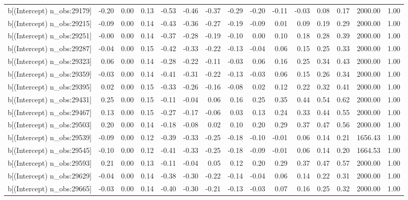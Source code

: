 \begin{table}[ht]
\begin{tabular}{rrrrrrrrrrrrrrr}
  b[(Intercept) n\_obs:29179] & -0.20 & 0.00 & 0.13 & -0.53 & -0.46 & -0.37 & -0.29 & -0.20 & -0.11 & -0.03 & 0.08 & 0.17 & 2000.00 & 1.00 \\ 
  b[(Intercept) n\_obs:29215] & -0.09 & 0.00 & 0.14 & -0.43 & -0.36 & -0.27 & -0.19 & -0.09 & 0.01 & 0.09 & 0.19 & 0.29 & 2000.00 & 1.00 \\ 
  b[(Intercept) n\_obs:29251] & -0.00 & 0.00 & 0.14 & -0.37 & -0.28 & -0.19 & -0.10 & 0.00 & 0.10 & 0.18 & 0.28 & 0.39 & 2000.00 & 1.00 \\ 
  b[(Intercept) n\_obs:29287] & -0.04 & 0.00 & 0.15 & -0.42 & -0.33 & -0.22 & -0.13 & -0.04 & 0.06 & 0.15 & 0.25 & 0.33 & 2000.00 & 1.00 \\ 
  b[(Intercept) n\_obs:29323] & 0.06 & 0.00 & 0.14 & -0.28 & -0.22 & -0.11 & -0.03 & 0.06 & 0.16 & 0.25 & 0.34 & 0.43 & 2000.00 & 1.00 \\ 
  b[(Intercept) n\_obs:29359] & -0.03 & 0.00 & 0.14 & -0.41 & -0.31 & -0.22 & -0.13 & -0.03 & 0.06 & 0.15 & 0.26 & 0.34 & 2000.00 & 1.00 \\ 
  b[(Intercept) n\_obs:29395] & 0.02 & 0.00 & 0.15 & -0.33 & -0.26 & -0.16 & -0.08 & 0.02 & 0.12 & 0.22 & 0.32 & 0.41 & 2000.00 & 1.00 \\ 
  b[(Intercept) n\_obs:29431] & 0.25 & 0.00 & 0.15 & -0.11 & -0.04 & 0.06 & 0.16 & 0.25 & 0.35 & 0.44 & 0.54 & 0.62 & 2000.00 & 1.00 \\ 
  b[(Intercept) n\_obs:29467] & 0.13 & 0.00 & 0.15 & -0.27 & -0.17 & -0.06 & 0.03 & 0.13 & 0.24 & 0.33 & 0.44 & 0.55 & 2000.00 & 1.00 \\ 
  b[(Intercept) n\_obs:29503] & 0.20 & 0.00 & 0.14 & -0.18 & -0.08 & 0.02 & 0.10 & 0.20 & 0.29 & 0.37 & 0.47 & 0.56 & 2000.00 & 1.00 \\ 
  b[(Intercept) n\_obs:29539] & -0.09 & 0.00 & 0.12 & -0.39 & -0.33 & -0.25 & -0.18 & -0.10 & -0.01 & 0.06 & 0.14 & 0.21 & 1656.43 & 1.00 \\ 
  b[(Intercept) n\_obs:29545] & -0.10 & 0.00 & 0.12 & -0.41 & -0.33 & -0.25 & -0.18 & -0.09 & -0.01 & 0.06 & 0.14 & 0.20 & 1664.53 & 1.00 \\ 
  b[(Intercept) n\_obs:29593] & 0.21 & 0.00 & 0.13 & -0.11 & -0.04 & 0.05 & 0.12 & 0.20 & 0.29 & 0.37 & 0.47 & 0.57 & 2000.00 & 1.00 \\ 
  b[(Intercept) n\_obs:29629] & -0.04 & 0.00 & 0.14 & -0.38 & -0.30 & -0.22 & -0.14 & -0.04 & 0.06 & 0.14 & 0.22 & 0.31 & 2000.00 & 1.00 \\ 
  b[(Intercept) n\_obs:29665] & -0.03 & 0.00 & 0.14 & -0.40 & -0.30 & -0.21 & -0.13 & -0.03 & 0.07 & 0.16 & 0.25 & 0.32 & 2000.00 & 1.00 \\ 

\end{tabular}
\end{table}
